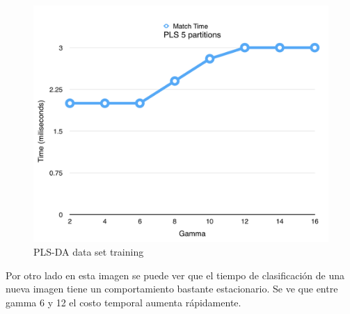\begin{figure}[h!]
  \begin{center}
	\includegraphics[scale=0.7]{exp2/PLS-Match-Time.png}
	\caption{PLS-DA data set training}
  \end{center}
\end{figure}

Por otro lado en esta imagen se puede ver que el tiempo de clasificación de una nueva imagen tiene un comportamiento bastante estacionario. Se ve que entre gamma 6 y 12 el costo temporal aumenta rápidamente.












